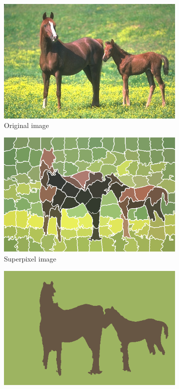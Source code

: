 \begin{figure}[htbp]
     \centering
     \begin{subfigure}[b]{0.3\textwidth}
         \centering
         \includegraphics[width=\textwidth]{figures/horses.jpg}
         \caption{Original image}
     \end{subfigure}
     \hfill
     \begin{subfigure}[b]{0.3\textwidth}
         \centering
         \includegraphics[width=\textwidth]{figures/contours_horses.png}
         \caption{Superpixel image}
     \end{subfigure}
     \hfill
     \begin{subfigure}[b]{0.3\textwidth}
         \centering
         \includegraphics[width=\textwidth]{figures/clustered_horses.png}

\end{subfigure}
\end{figure}
